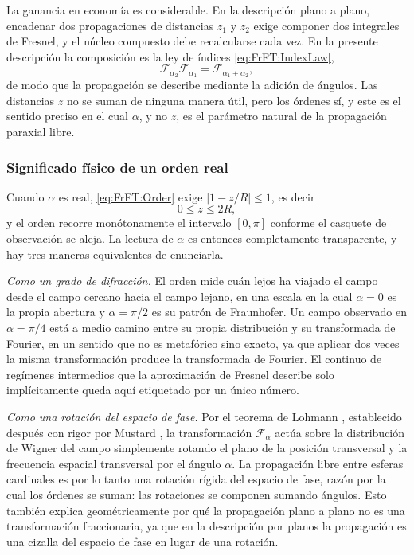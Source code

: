 			La ganancia en economía es considerable. En la descripción plano a plano, encadenar dos propagaciones de distancias $z_{1}$ y $z_{2}$ exige componer dos integrales de Fresnel, y el núcleo compuesto debe recalcularse cada vez. En la presente descripción la composición es la ley de índices \eqref{eq:FrFT:IndexLaw},
			\begin{equation}\label{eq:FrFT:Chaining}
				\mathcal{F}_{\alpha_{2}}\mathcal{F}_{\alpha_{1}} = \mathcal{F}_{\alpha_{1}+\alpha_{2}},
			\end{equation}
			de modo que la propagación se describe mediante la adición de ángulos. Las distancias $z$ no se suman de ninguna manera útil, pero los órdenes sí, y este es el sentido preciso en el cual $\alpha$, y no $z$, es el parámetro natural de la propagación paraxial libre.

		\subsubsection{Significado físico de un orden real}

			Cuando $\alpha$ es real, \eqref{eq:FrFT:Order} exige $\left|1-z/R\right|\leq 1$, es decir
			\begin{equation}\label{eq:FrFT:RealRange}
				0 \leq z \leq 2R,
			\end{equation}
			y el orden recorre monótonamente el intervalo $[0,\pi]$ conforme el casquete de observación se aleja. La lectura de $\alpha$ es entonces completamente transparente, y hay tres maneras equivalentes de enunciarla.

			\textit{Como un grado de difracción.} El orden mide cuán lejos ha viajado el campo desde el campo cercano hacia el campo lejano, en una escala en la cual $\alpha = 0$ es la propia abertura y $\alpha = \pi/2$ es su patrón de Fraunhofer. Un campo observado en $\alpha = \pi/4$ está a medio camino entre su propia distribución y su transformada de Fourier, en un sentido que no es metafórico sino exacto, ya que aplicar dos veces la misma transformación produce la transformada de Fourier. El continuo de regímenes intermedios que la aproximación de Fresnel describe solo implícitamente queda aquí etiquetado por un único número.

			\textit{Como una rotación del espacio de fase.} Por el teorema de Lohmann \citeyearpar{lohmann1993image}, establecido después con rigor por Mustard \citeyearpar{mustard1996fractional}, la transformación $\mathcal{F}_{\alpha}$ actúa sobre la distribución de Wigner del campo simplemente rotando el plano de la posición transversal y la frecuencia espacial transversal por el ángulo $\alpha$. La propagación libre entre esferas cardinales es por lo tanto una rotación rígida del espacio de fase, razón por la cual los órdenes se suman: las rotaciones se componen sumando ángulos. Esto también explica geométricamente por qué la propagación plano a plano no es una transformación fraccionaria, ya que en la descripción por planos la propagación es una cizalla del espacio de fase en lugar de una rotación.

